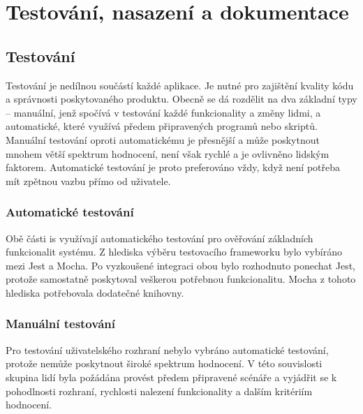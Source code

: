 \chapter{Testování, nasazení a dokumentace}


\section{Testování}

Testování je nedílnou součástí každé aplikace. Je nutné pro zajištění kvality kódu a správnosti poskytovaného produktu. Obecně se dá rozdělit na dva základní typy -- manuální, jenž spočívá v testování každé funkcionality a změny lidmi, a automatické, které využívá předem připravených programů nebo skriptů. Manuální testování oproti automatickému je přesnější a může poskytnout mnohem větší spektrum hodnocení, není však rychlé a je ovlivněno lidským faktorem. Automatické testování je proto preferováno vždy, když není potřeba mít zpětnou vazbu přímo od uživatele.



\subsection{Automatické testování}

Obě části \gls{is} využívají automatického testování pro ověřování základních funkcionalit systému. Z hlediska výběru testovacího frameworku bylo vybíráno mezi Jest a Mocha. Po vyzkoušené integraci obou bylo rozhodnuto ponechat Jest, protože samostatně poskytoval veškerou potřebnou funkcionalitu. Mocha z tohoto hlediska potřebovala dodatečné knihovny.


\subsection{Manuální testování}

Pro testování uživatelského rozhraní nebylo vybráno automatické testování, protože nemůže poskytnout široké spektrum hodnocení. V této souvislosti skupina lidí byla požádána provést předem připravené scénáře a vyjádřit se k pohodlnosti rozhraní, rychlosti nalezení funkcionality a dalším kritériím hodnocení. 


